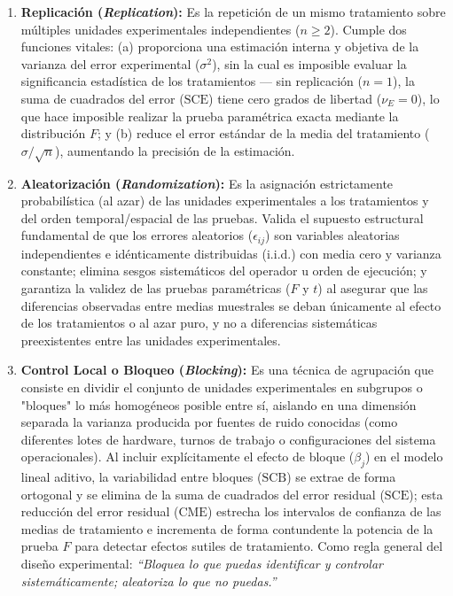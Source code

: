 \begin{teorema}
	\begin{enumerate}
		\item \textbf{Replicación (\emph{Replication}):} Es la repetición de un mismo tratamiento sobre múltiples unidades experimentales independientes ($n\geq 2$). Cumple dos funciones vitales: (a) proporciona una estimación interna y objetiva de la varianza del error experimental ($\sigma^2$), sin la cual es imposible evaluar la significancia estadística de los tratamientos --- sin replicación ($n=1$), la suma de cuadrados del error ($\text{SCE}$) tiene cero grados de libertad ($\nu_E=0$), lo que hace imposible realizar la prueba paramétrica exacta mediante la distribución $F$; y (b) reduce el error estándar de la media del tratamiento ($\sigma / \sqrt{n}$), aumentando la precisión de la estimación.
		\item \textbf{Aleatorización (\emph{Randomization}):} Es la asignación estrictamente probabilística (al azar) de las unidades experimentales a los tratamientos y del orden temporal/espacial de las pruebas. Valida el supuesto estructural fundamental de que los errores aleatorios ($\epsilon_{ij}$) son variables aleatorias independientes e idénticamente distribuidas (i.i.d.) con media cero y varianza constante; elimina sesgos sistemáticos del operador u orden de ejecución; y garantiza la validez de las pruebas paramétricas ($F$ y $t$) al asegurar que las diferencias observadas entre medias muestrales se deban únicamente al efecto de los tratamientos o al azar puro, y no a diferencias sistemáticas preexistentes entre las unidades experimentales.
		\item \textbf{Control Local o Bloqueo (\emph{Blocking}):} Es una técnica de agrupación que consiste en dividir el conjunto de unidades experimentales en subgrupos o "bloques" lo más homogéneos posible entre sí, aislando en una dimensión separada la varianza producida por fuentes de ruido conocidas (como diferentes lotes de hardware, turnos de trabajo o configuraciones del sistema operacionales). Al incluir explícitamente el efecto de bloque ($\beta_j$) en el modelo lineal aditivo, la variabilidad entre bloques ($\text{SCB}$) se extrae de forma ortogonal y se elimina de la suma de cuadrados del error residual ($\text{SCE}$); esta reducción del error residual ($\text{CME}$) estrecha los intervalos de confianza de las medias de tratamiento e incrementa de forma contundente la potencia de la prueba $F$ para detectar efectos sutiles de tratamiento. Como regla general del diseño experimental: \emph{``Bloquea lo que puedas identificar y controlar sistemáticamente; aleatoriza lo que no puedas.''}
	\end{enumerate}
\end{teorema}

